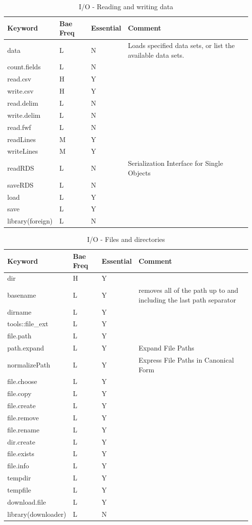 \documentclass[11pt,]{krantz}
\theoremstyle{definition}
\theoremstyle{definition}
\theoremstyle{remark}
\begin{document}
\begin{longtable}[t]{llll}
\caption{\label{tab:knitchunk25}I/O - Reading and writing data}\\
\toprule
Keyword & Bae Freq & Essential & Comment\\
\midrule
data & L & N & Loads specified data sets, or list the available data sets.\\
count.fields & L & N & \\
read.csv & H & Y & \\
write.csv & H & Y & \\
read.delim & L & N & \\
\addlinespace
write.delim & L & N & \\
read.fwf & L & N & \\
readLines & M & Y & \\
writeLines & M & Y & \\
readRDS & L & N & Serialization Interface for Single Objects\\
\addlinespace
saveRDS & L & N & \\
load & L & Y & \\
save & L & Y & \\
library(foreign) & L & N & \\
\bottomrule
\end{longtable}

\begin{longtable}[t]{llll}
\caption{\label{tab:knitchunk26}I/O - Files and directories }\\
\toprule
Keyword & Bae Freq & Essential & Comment\\
\midrule
dir & H & Y & \\
basename & L & Y & removes all of the path up to and including the last path separator\\
dirname & L & Y & \\
tools::file\_ext & L & Y & \\
file.path & L & Y & \\
\addlinespace
path.expand & L & Y & Expand File Paths\\
normalizePath & L & Y & Express File Paths in Canonical Form\\
file.choose & L & Y & \\
file.copy & L & Y & \\
file.create & L & Y & \\
\addlinespace
file.remove & L & Y & \\
file.rename & L & Y & \\
dir.create & L & Y & \\
file.exists & L & Y & \\
file.info & L & Y & \\
\addlinespace
tempdir & L & Y & \\
tempfile & L & Y & \\
download.file & L & Y & \\
library(downloader) & L & N & \\
\bottomrule
\end{longtable}
\end{document}
